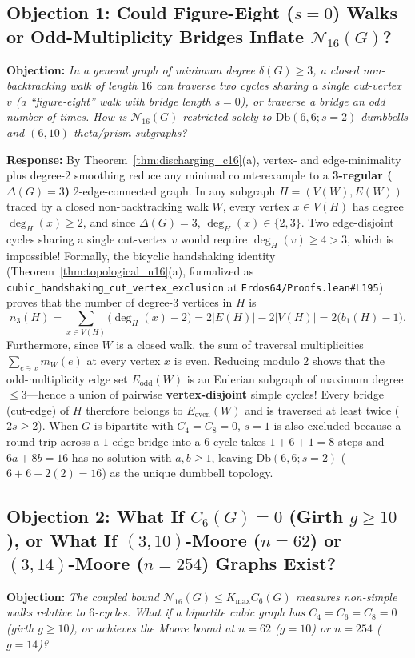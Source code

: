 \documentclass[10pt,a4paper]{article}
\theoremstyle{definition}
\theoremstyle{remark}
\begin{document}
\subsection{Objection 1: Could Figure-Eight ($s=0$) Walks or Odd-Multiplicity Bridges Inflate $\mathcal{N}_{16}(G)$?}
\textbf{Objection:} \emph{In a general graph of minimum degree $\delta(G) \ge 3$, a closed non-backtracking walk of length $16$ can traverse two cycles sharing a single cut-vertex $v$ (a ``figure-eight'' walk with bridge length $s=0$), or traverse a bridge an odd number of times. How is $\mathcal{N}_{16}(G)$ restricted solely to $\mathrm{Db}(6,6;s=2)$ dumbbells and $(6,10)$ theta/prism subgraphs?}

\textbf{Response:} By Theorem~\ref{thm:discharging_c16}(a), vertex- and edge-minimality plus degree-2 smoothing reduce any minimal counterexample to a \textbf{3-regular ($\Delta(G)=3$)} 2-edge-connected graph. In any subgraph $H = (V(W), E(W))$ traced by a closed non-backtracking walk $W$, every vertex $x \in V(H)$ has degree $\deg_H(x) \ge 2$, and since $\Delta(G)=3$, $\deg_H(x) \in \{2, 3\}$. Two edge-disjoint cycles sharing a single cut-vertex $v$ would require $\deg_H(v) \ge 4 > 3$, which is impossible! Formally, the bicyclic handshaking identity (Theorem~\ref{thm:topological_n16}(a), formalized as \texttt{cubic\_handshaking\_cut\_vertex\_exclusion} at \texttt{Erdos64/Proofs.lean\#L195}) proves that the number of degree-3 vertices in $H$ is
\[
  n_3(H) = \sum_{x \in V(H)} \bigl(\deg_H(x) - 2\bigr) = 2|E(H)| - 2|V(H)| = 2\bigl(b_1(H) - 1\bigr).
\]
Furthermore, since $W$ is a closed walk, the sum of traversal multiplicities $\sum_{e \ni x} m_W(e)$ at every vertex $x$ is even. Reducing modulo $2$ shows that the odd-multiplicity edge set $E_{\mathrm{odd}}(W)$ is an Eulerian subgraph of maximum degree $\le 3$---hence a union of pairwise \textbf{vertex-disjoint} simple cycles! Every bridge (cut-edge) of $H$ therefore belongs to $E_{\mathrm{even}}(W)$ and is traversed at least twice ($2s \ge 2$). When $G$ is bipartite with $C_4 = C_8 = 0$, $s=1$ is also excluded because a round-trip across a $1$-edge bridge into a $6$-cycle takes $1+6+1=8$ steps and $6a + 8b = 16$ has no solution with $a,b \ge 1$, leaving $\mathrm{Db}(6,6;s=2)$ ($6+6+2(2)=16$) as the unique dumbbell topology.

\subsection{Objection 2: What If $C_6(G) = 0$ (Girth $g \ge 10$), or What If $(3,10)$-Moore ($n=62$) or $(3,14)$-Moore ($n=254$) Graphs Exist?}
\textbf{Objection:} \emph{The coupled bound $\mathcal{N}_{16}(G) \le K_{\max} C_6(G)$ measures non-simple walks relative to $6$-cycles. What if a bipartite cubic graph has $C_4 = C_6 = C_8 = 0$ (girth $g \ge 10$), or achieves the Moore bound at $n=62$ ($g=10$) or $n=254$ ($g=14$)?}
\end{document}
